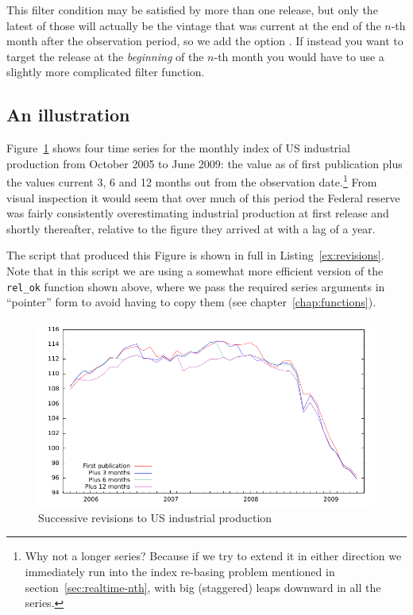 This filter condition may be satisfied by more than one release, but
only the latest of those will actually be the vintage that was current
at the end of the $n$-th month after the observation period, so we add
the option .  If instead you
want to target the release at the \emph{beginning} of the $n$-th month
you would have to use a slightly more complicated filter function.

\subsection{An illustration}

Figure~\ref{fig:realtime-lag} shows four time series for the monthly
index of US industrial production from October 2005 to June 2009: the
value as of first publication plus the values current 3, 6 and 12
months out from the observation date.\footnote{Why not a longer
  series? Because if we try to extend it in either direction we
  immediately run into the index re-basing problem mentioned in
  section~\ref{sec:realtime-nth}, with big (staggered) leaps downward
  in all the series.} From visual inspection it would seem that over
much of this period the Federal reserve was fairly consistently
overestimating industrial production at first release and shortly
thereafter, relative to the figure they arrived at with a lag of a
year.

The script that produced this Figure is shown in full in
Listing~\ref{ex:revisions}. Note that in this script we are using a
somewhat more efficient version of the \verb|rel_ok| function shown
above, where we pass the required series arguments in ``pointer'' form
to avoid having to copy them (see chapter~\ref{chap:functions}).

\begin{figure}[htbp]
  \centering
\includegraphics{figures/realtime}
  \caption{Successive revisions to US industrial production}
  \label{fig:realtime-lag}
\end{figure}


